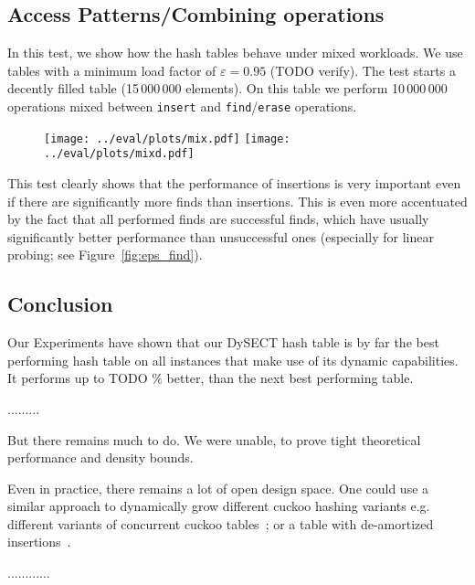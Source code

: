 \documentclass[a4paper,UKenglish]{lipics-v2016}
\begin{document}
\subsection{Access Patterns/Combining operations}
\label{sec:exp_mix}
In this test, we show how the hash tables behave under mixed
workloads.  We use tables with a minimum load factor of $\varepsilon =
0.95$ (TODO verify).  The test starts a decently filled table
(15\,000\,000 elements).  On this table we perform 10\,000\,000
operations mixed between \verb~insert~ and \verb~find~/\verb~erase~
operations.

\begin{figure}[ht]
  \centering
  \texttt{[image: ../eval/plots/mix.pdf]}
  \texttt{[image: ../eval/plots/mixd.pdf]}
  \caption{\label{fig:mix} }
\end{figure}

This test clearly shows that the
performance of insertions is very important even if there are
significantly more finds than insertions.  This is even more
accentuated by the fact that all performed finds are successful finds,
which have usually significantly better performance than unsuccessful
ones (especially for linear probing; see Figure~\ref{fig:eps_find}).

\subsection{Conclusion}
Our Experiments have shown that our DySECT hash table is by far the
best performing hash table on all instances that make use of its
dynamic capabilities.  It performs up to TODO $\%$ better, than the
next best performing table.


.........


But there remains much to do. We were unable, to prove tight
theoretical performance and density bounds.

Even in practice, there remains a lot of open design space.  One could
use a similar approach to dynamically grow different cuckoo hashing
variants e.g. different variants of concurrent cuckoo
tables~\cite{AlgorithmicImprovementsForFastConcurrentCuckooHashing,
  LockFreeCuckooHashing}; or a table with de-amortized
insertions~\cite{UsingAQueueToDeAmortizeCuckooHashingInHardware,
  DeAmortizedCuckooHashingProvableWorstCasePerformanceAndExperimentalResults}.

............





\end{document}
